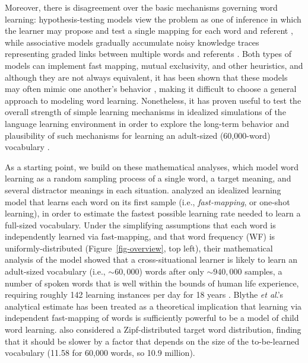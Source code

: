 \documentclass[a4paper,natbib,man]{apa6}
\newcommand{\GK}[1]{#1}
\begin{document}
\GK{Moreover, there is disagreement over the basic mechanisms governing word learning: hypothesis-testing models view the problem as one of inference in which the learner may propose and test a single mapping for each word and referent \citep[e.g.,][]{Trueswell:2013}, while associative models gradually accumulate noisy knowledge traces representing graded links between multiple words and referents \citep[e.g.,][]{McMurray:2012,Kachergis:2012gi}.
Both types of models can implement fast mapping, mutual exclusivity, and other heuristics, and although they are not always equivalent, it has been shown that these models may often mimic one another's behavior \citep{Yu:2012hyp}, making it difficult to choose a general approach to modeling word learning. 
Nonetheless, it has proven useful to test the overall strength of simple learning mechanisms in idealized simulations of the language learning environment in order to explore the long-term behavior and plausibility of such mechanisms for learning an adult-sized (60,000-word) vocabulary \citep{Blythe:2010,Vogt:2012,Blythe:2016}.}


As a starting point, we build on these mathematical analyses, which model word learning as a random sampling process of a single word, a target meaning, and several distractor meanings in each situation. 
\cite{Blythe:2010,Blythe:2016} analyzed an idealized learning model that learns each word on its first sample (i.e., {\it fast-mapping}, or one-shot learning), in order to estimate the fastest possible learning rate needed to learn a full-sized vocabulary.
Under the simplifying assumptions that each word is independently learned via fast-mapping, and that word frequency (WF) is uniformly-distributed (Figure~\ref{fig-overview}, top left), their mathematical analysis of the model showed that a cross-situational learner is likely to learn an adult-sized vocabulary (i.e., $\sim60,000$) words after only $\sim940,000$ samples, a number of spoken words that is well within the bounds of human life experience, requiring roughly 142 learning instances per day for 18 years \citep{Blythe:2010}. %
Blythe \textit{et al}.'s analytical estimate has been treated as a theoretical implication that learning via independent fast-mapping of words is sufficiently powerful to be a model of child word learning. 
\cite{Blythe:2010} also considered a Zipf-distributed target word distribution, finding that it should be slower by a factor that depends on the size of the to-be-learned vocabulary (11.58 for 60,000 words, so 10.9 million). %
\end{document}
